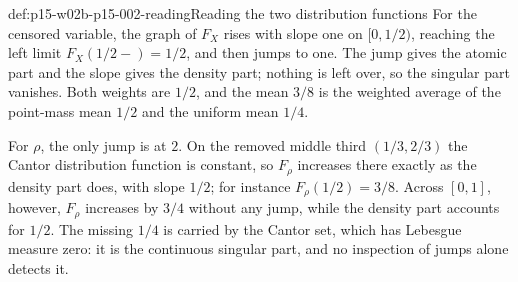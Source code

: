 \begin{hbexample}{def:p15-w02b-p15-002-reading}{Reading the two distribution functions}
For the censored variable, the graph of \(F_X\) rises with slope one on
\([0,1/2)\), reaching the left limit \(F_X(1/2-)=1/2\), and then jumps to
one. The jump gives the atomic part and the slope gives the density part;
nothing is left over, so the singular part vanishes. Both weights are
\(1/2\), and the mean \(3/8\) is the weighted average of the point-mass
mean \(1/2\) and the uniform mean \(1/4\).

For \(\rho\), the only jump is at \(2\). On the removed middle third
\((1/3,2/3)\) the Cantor distribution function is constant, so
\(F_\rho\) increases there exactly as the density part does, with slope
\(1/2\); for instance \(F_\rho(1/2)=3/8\). Across \([0,1]\), however,
\(F_\rho\) increases by \(3/4\) without any jump, while the density part
accounts for \(1/2\). The missing \(1/4\) is carried by the Cantor set,
which has Lebesgue measure zero: it is the continuous singular part, and
no inspection of jumps alone detects it.
\end{hbexample}


